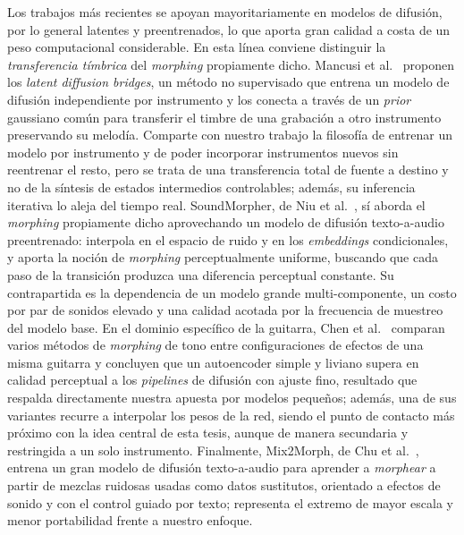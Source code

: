 \documentclass[12pt,a4paper,twoside]{tesis}
\begin{document}
Los trabajos más recientes se apoyan mayoritariamente en modelos de difusión, por lo general latentes y preentrenados, lo que aporta gran calidad a costa de un peso computacional considerable. En esta línea conviene distinguir la \emph{transferencia tímbrica} del \emph{morphing} propiamente dicho. Mancusi et al.~\cite{mancusi2025latentbridges} proponen los \textit{latent diffusion bridges}, un método no supervisado que entrena un modelo de difusión independiente por instrumento y los conecta a través de un \textit{prior} gaussiano común para transferir el timbre de una grabación a otro instrumento preservando su melodía. Comparte con nuestro trabajo la filosofía de entrenar un modelo por instrumento y de poder incorporar instrumentos nuevos sin reentrenar el resto, pero se trata de una transferencia total de fuente a destino y no de la síntesis de estados intermedios controlables; además, su inferencia iterativa lo aleja del tiempo real. SoundMorpher, de Niu et al.~\cite{niu2024soundmorpher}, sí aborda el \emph{morphing} propiamente dicho aprovechando un modelo de difusión texto-a-audio preentrenado: interpola en el espacio de ruido y en los \textit{embeddings} condicionales, y aporta la noción de \emph{morphing} perceptualmente uniforme, buscando que cada paso de la transición produzca una diferencia perceptual constante. Su contrapartida es la dependencia de un modelo grande multi-componente, un costo por par de sonidos elevado y una calidad acotada por la frecuencia de muestreo del modelo base. En el dominio específico de la guitarra, Chen et al.~\cite{chen2025guitartonemorphing} comparan varios métodos de \emph{morphing} de tono entre configuraciones de efectos de una misma guitarra y concluyen que un autoencoder simple y liviano supera en calidad perceptual a los \textit{pipelines} de difusión con ajuste fino, resultado que respalda directamente nuestra apuesta por modelos pequeños; además, una de sus variantes recurre a interpolar los pesos de la red, siendo el punto de contacto más próximo con la idea central de esta tesis, aunque de manera secundaria y restringida a un solo instrumento. Finalmente, Mix2Morph, de Chu et al.~\cite{chu2026mix2morph}, entrena un gran modelo de difusión texto-a-audio para aprender a \emph{morphear} a partir de mezclas ruidosas usadas como datos sustitutos, orientado a efectos de sonido y con el control guiado por texto; representa el extremo de mayor escala y menor portabilidad frente a nuestro enfoque.
\end{document}
